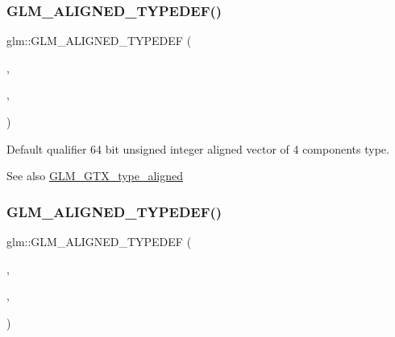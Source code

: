 \subsubsection{\texorpdfstring{G\+L\+M\+\_\+\+A\+L\+I\+G\+N\+E\+D\+\_\+\+T\+Y\+P\+E\+D\+E\+F()}{GLM\_ALIGNED\_TYPEDEF()}\hspace{0.1cm}{\footnotesize\ttfamily [136/209]}}
{\footnotesize\ttfamily glm\+::\+G\+L\+M\+\_\+\+A\+L\+I\+G\+N\+E\+D\+\_\+\+T\+Y\+P\+E\+D\+EF (\begin{DoxyParamCaption}\item[{\hyperlink{group__gtc__type__precision_ga70396c4f422824503c870db50b3059fd}{u64vec4}}]{,  }\item[{aligned\+\_\+u64vec4}]{,  }\item[{32}]{ }\end{DoxyParamCaption})}

Default qualifier 64 bit unsigned integer aligned vector of 4 components type. \begin{DoxySeeAlso}{See also}
\hyperlink{group__gtx__type__aligned}{G\+L\+M\+\_\+\+G\+T\+X\+\_\+type\+\_\+aligned} 
\end{DoxySeeAlso}
\mbox{\label{group__gtx__type__aligned_gab3301bae94ef5bf59fbdd9a24e7d2a01}} 
\subsubsection{\texorpdfstring{G\+L\+M\+\_\+\+A\+L\+I\+G\+N\+E\+D\+\_\+\+T\+Y\+P\+E\+D\+E\+F()}{GLM\_ALIGNED\_TYPEDEF()}\hspace{0.1cm}{\footnotesize\ttfamily [137/209]}}
{\footnotesize\ttfamily glm\+::\+G\+L\+M\+\_\+\+A\+L\+I\+G\+N\+E\+D\+\_\+\+T\+Y\+P\+E\+D\+EF (\begin{DoxyParamCaption}\item[{\hyperlink{group__gtc__type__precision_ga814f2f65354b6588b067cc5c67a6b340}{float32}}]{,  }\item[{aligned\+\_\+float32}]{,  }\item[{4}]{ }\end{DoxyParamCaption})}


